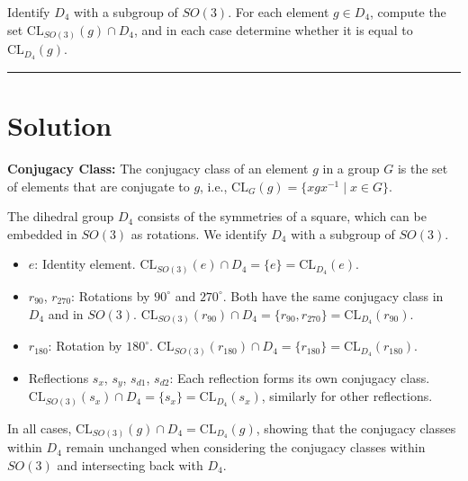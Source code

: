 \documentclass[12pt]{amsart}
\theoremstyle{definition}
\numberwithin{equation}{section}
\begin{document}
\begin{exercise}{6} Identify \(D_4\) with a subgroup of \(SO(3)\). For each element \(g \in D_4\), compute the set \(\text{CL}_{SO(3)}(g) \cap D_4\), and in each case determine whether it is equal to \(\text{CL}_{D_4}(g)\).

    \noindent\rule{\linewidth}{1pt}

    \section*{Solution}
    
    \noindent \textbf{Conjugacy Class:} The conjugacy class of an element \( g \) in a group \( G \) is the set of elements that are conjugate to \( g \), i.e., \(\text{CL}_G(g) = \{ xgx^{-1} \mid x \in G \}\).
    
    The dihedral group \(D_4\) consists of the symmetries of a square, which can be embedded in \(SO(3)\) as rotations. We identify \(D_4\) with a subgroup of \(SO(3)\).

    \begin{itemize}
        \item \(e\): Identity element. \(\text{CL}_{SO(3)}(e) \cap D_4 = \{e\} = \text{CL}_{D_4}(e)\).
        \item \(r_{90}\), \(r_{270}\): Rotations by \(90^\circ\) and \(270^\circ\). Both have the same conjugacy class in \(D_4\) and in \(SO(3)\). \(\text{CL}_{SO(3)}(r_{90}) \cap D_4 = \{r_{90}, r_{270}\} = \text{CL}_{D_4}(r_{90})\).
        \item \(r_{180}\): Rotation by \(180^\circ\). \(\text{CL}_{SO(3)}(r_{180}) \cap D_4 = \{r_{180}\} = \text{CL}_{D_4}(r_{180})\).
        \item Reflections \(s_x\), \(s_y\), \(s_{d1}\), \(s_{d2}\): Each reflection forms its own conjugacy class. \(\text{CL}_{SO(3)}(s_x) \cap D_4 = \{s_x\} = \text{CL}_{D_4}(s_x)\), similarly for other reflections.
    \end{itemize}
    
    In all cases, \(\text{CL}_{SO(3)}(g) \cap D_4 = \text{CL}_{D_4}(g)\), showing that the conjugacy classes within \(D_4\) remain unchanged when considering the conjugacy classes within \(SO(3)\) and intersecting back with \(D_4\).

\end{exercise}
\newpage
\end{document}
